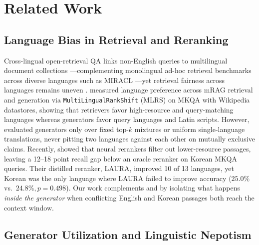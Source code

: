 \section{Related Work}
\label{sec:related_work}

\subsection{Language Bias in Retrieval and Reranking}
\label{subsec:rw_retrieval}

Cross-lingual open-retrieval QA links non-English queries to multilingual document collections \citep{asai2021xor,asai2021one,asai2022mia}---complementing monolingual ad-hoc retrieval benchmarks across diverse languages such as MIRACL \citep{zhang2023miracl}---yet retrieval fairness across languages remains uneven \citep{yang2024language,amiraz2025crosslingual}. \citet{park2025investigating} measured language preference across mRAG retrieval and generation via \texttt{MultiLingualRankShift} (MLRS) on MKQA \citep{longpre2021mkqa} with Wikipedia datastores, showing that retrievers favor high-resource and query-matching languages whereas generators favor query languages and Latin scripts. However, \citet{park2025investigating} evaluated generators only over fixed top-$k$ mixtures or uniform single-language translations, never pitting two languages against each other on mutually exclusive claims. Recently, \citet{wang2026languages} showed that neural rerankers filter out lower-resource passages, leaving a 12--18 point recall gap below an oracle reranker on Korean MKQA queries. Their distilled reranker, LAURA, improved 10 of 13 languages, yet Korean was the only language where LAURA failed to improve accuracy ($25.0\%$ vs.\ $24.8\%, p{=}0.498$). Our work complements \citet{park2025investigating} and \citet{wang2026languages} by isolating what happens \emph{inside the generator} when conflicting English and Korean passages both reach the context window.

\subsection{Generator Utilization and Linguistic Nepotism}
\label{subsec:rw_generator}

